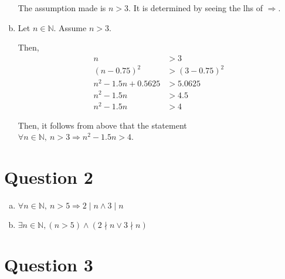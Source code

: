 \documentclass[12pt]{article}
\begin{document}
\begin{enumerate}[a.]
    The assumption made is $n > 3$. It is determined by seeing the lhs of
    $\Rightarrow$.

    \item

    Let $n \in \mathbb{N}$. Assume $n > 3$.

    \bigskip

    Then,
    \setcounter{equation}{0}
    \begin{align}
        n &> 3\\
        (n - 0.75)^2 &> (3 - 0.75)^2\\
        n^2 - 1.5n + 0.5625 &> 5.0625\\
        n^2 - 1.5n &> 4.5\\
        n^2 - 1.5n &> 4
    \end{align}

    \bigskip

    Then, it follows from above that the statement $\forall n \in \mathbb{N},\:
    n > 3 \Rightarrow n^2 - 1.5n > 4$.

\end{enumerate}

\section*{Question 2}
\begin{enumerate}[a.]
    \item

    $\forall n \in \mathbb{N},\:n > 5 \Rightarrow 2 \mid n \land 3 \mid n$

    \item

    $\exists n \in \mathbb{N}, (n > 5) \land (2 \nmid n \lor 3 \nmid n)$
\end{enumerate}

\section*{Question 3}
\end{document}
